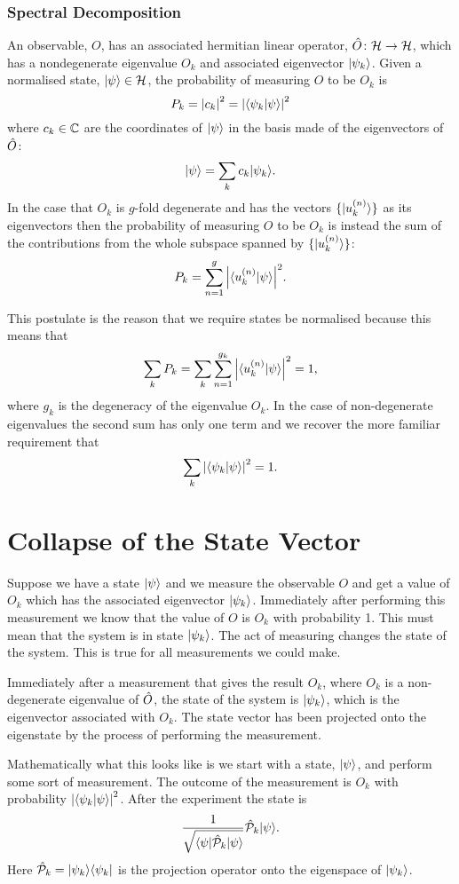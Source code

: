     \subsubsection{Spectral Decomposition}
    \begin{postulate}
        An observable, \(O\), has an associated hermitian linear operator, \(\hat{O}\colon\mathcal{H}\to\mathcal{H}\), which has a nondegenerate eigenvalue \(O_k\) and associated eigenvector \(\vert {\psi_k} \rangle\).
        Given a normalised state, \(\vert {\psi} \rangle\in\mathcal{H}\), the probability of measuring \(O\) to be \(O_k\) is
        \[P_k = \abs{c_k}^2 = \abs{\langle {\psi_k} \vert {\psi} \rangle}^2\]
        where \(c_k\in\mathbb{C}\) are the coordinates of \(\vert {\psi} \rangle\) in the basis made of the eigenvectors of \(\hat{O}\):
        \[\vert {\psi} \rangle = \sum_{k}c_k\vert {\psi_k} \rangle.\]
        In the case that \(O_k\) is \(g\)-fold degenerate and has the vectors \(\{\vert {u_k^{(n)}} \rangle\}\) as its eigenvectors then the probability of measuring \(O\) to be \(O_k\) is instead the sum of the contributions from the whole subspace spanned by \(\{\vert {u_k^{(n)}} \rangle\}\):
        \[P_k = \sum_{n=1}^{g} \abs{\langle {u_k^{(n)}} \vert {\psi} \rangle}^2.\]
    \end{postulate}
    This postulate is the reason that we require states be normalised because this means that
    \[\sum_k P_k = \sum_k\sum_{n=1}^{g_k}\abs{\langle {u_k^{(n)}} \vert {\psi} \rangle}^2 = 1,\]
    where \(g_k\) is the degeneracy of the eigenvalue \(O_k\).
    In the case of non-degenerate eigenvalues the second sum has only one term and we recover the more familiar requirement that
    \[\sum_k \abs{\langle {\psi_k} \vert {\psi} \rangle}^2 = 1.\]
    
    
    \section{Collapse of the State Vector}
    Suppose we have a state \(\vert {\psi} \rangle\) and we measure the observable \(O\) and get a value of \(O_k\) which has the associated eigenvector \(\vert {\psi_k} \rangle\).
    Immediately after performing this measurement we know that the value of \(O\) is \(O_k\) with probability 1.
    This must mean that the system is in state \(\vert {\psi_k} \rangle\).
    The act of measuring changes the state of the system.
    This is true for all measurements we could make.
    \begin{postulate}
        Immediately after a measurement that gives the result \(O_k\), where \(O_k\) is a non-degenerate eigenvalue of \(\hat{O}\), the state of the system is \(\vert {\psi_k} \rangle\), which is the eigenvector associated with \(O_k\).
        The state vector has been projected onto the eigenstate by the process of performing the measurement.
    \end{postulate}
    Mathematically what this looks like is we start with a state, \(\vert {\psi} \rangle\), and perform some sort of measurement.
    The outcome of the measurement is \(O_k\) with probability \(\abs{\langle {\psi_k} \vert {\psi} \rangle}^2\).
    After the experiment the state is
    \[\frac{1}{\sqrt{\langle {\psi} \vert\hat{\mathcal{P}}_k\vert {\psi} \rangle}}\hat{\mathcal{P}}_k\vert {\psi} \rangle.\]
    Here \(\hat{\mathcal{P}}_k = \vert {\psi_k}\rangle\langle {\psi_k} \vert\) is the projection operator onto the eigenspace of \(\vert {\psi_k} \rangle\).
    
